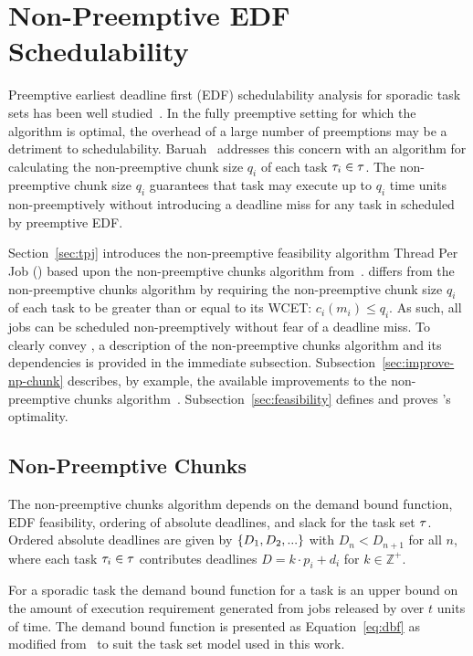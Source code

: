 \renewcommand{\tex}[1]{30-schedulability/#1}

\section{Non-Preemptive EDF Schedulability}\label{sec:schedulability}

Preemptive earliest deadline first (EDF) schedulability analysis for
sporadic task sets has been well
studied~\cite{Liu:1973,Baruah:1990,George:1996}. In the fully 
preemptive setting for which the algorithm is optimal, the
overhead of a large number of preemptions may be a detriment to
schedulability. Baruah~\cite{Baruah:2005} addresses this concern with
an algorithm for calculating the non-preemptive chunk size ${q_i}$ of
each task ${\tau_{i} \in \tau}$. The non-preemptive chunk size
${q_i}$ guarantees that task  may execute up to ${q_i}$ time
units non-preemptively without introducing a deadline miss for any
task in \tasks{} scheduled by preemptive EDF.

Section~\ref{sec:tpj} introduces the non-preemptive feasibility algorithm
Thread Per Job (\tpj) based upon the non-preemptive chunks algorithm
from~\cite{Baruah:2005}. \tpj{} differs from the non-preemptive chunks
algorithm by requiring the non-preemptive chunk size ${q_i}$ of each
task  to be greater than or equal to its WCET: ${c_i(m_i) \le
  q_i}$. As such, all jobs can be scheduled non-preemptively without
fear of a deadline miss. To clearly convey \tpj{}, a description of
the non-preemptive chunks algorithm and its dependencies is provided
in the immediate subsection. Subsection~\ref{sec:improve-np-chunk}
describes, by example, the available improvements to the
non-preemptive chunks algorithm~\cite{Baruah:2005}.
Subsection~\ref{sec:feasibility} defines and proves \tpj{}'s
optimality.

\subsection{Non-Preemptive Chunks}

The non-preemptive chunks algorithm depends on the demand bound
function, EDF feasibility, ordering of absolute deadlines, and slack
for the task set ${\tau}$. Ordered absolute deadlines are given by
${\{D_{1}, D_{2},   ... \}}$ with ${D_n < D_{n+1}}$
for all ${n}$, where each task ${\tau_{i} \in \tau}$ contributes
deadlines ${D = k \cdot p_i + d_i}$ for ${k \in \mathbb{Z}^+}$. 

For a sporadic task  the demand bound function for a task
 is an upper bound on the amount of execution
requirement generated from jobs released by  over ${t}$ units
of time. The demand bound function is presented as
Equation~\ref{eq:dbf} as  modified
from~\cite{Baruah:1990} to suit the task set model used in this work.

